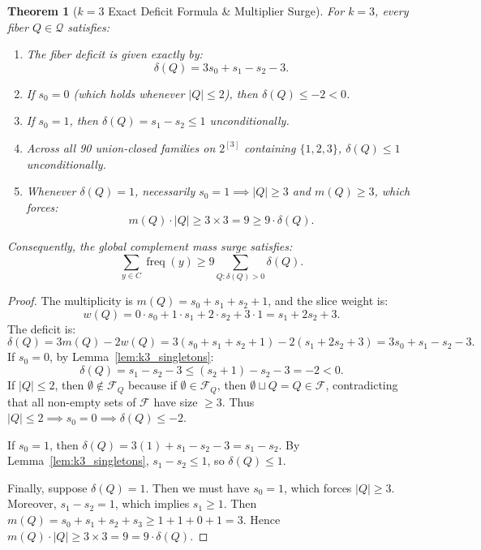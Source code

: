 \documentclass[11pt,a4paper]{article}
\theoremstyle{plain}
\newtheorem{theorem}{Theorem}[section]
\theoremstyle{definition}
\theoremstyle{remark}
\newcommand{\F}{\mathcal{F}}
\newcommand{\Q}{\mathcal{Q}}
\newcommand{\freq}{\operatorname{freq}}
\begin{document}
\begin{theorem}[$k=3$ Exact Deficit Formula \& Multiplier Surge]\label{thm:k3_multiplier}
For $k = 3$, every fiber $Q \in \Q$ satisfies:
\begin{enumerate}
    \item The fiber deficit is given exactly by:
    \begin{equation}
    \delta(Q) = 3 s_0 + s_1 - s_2 - 3.
    \end{equation}
    \item If $s_0 = 0$ (which holds whenever $|Q| \le 2$), then $\delta(Q) \le -2 < 0$.
    \item If $s_0 = 1$, then $\delta(Q) = s_1 - s_2 \le 1$ unconditionally.
    \item Across all 90 union-closed families on $2^{[3]}$ containing $\{1, 2, 3\}$, $\delta(Q) \le 1$ unconditionally.
    \item Whenever $\delta(Q) = 1$, necessarily $s_0 = 1 \implies |Q| \ge 3$ and $m(Q) \ge 3$, which forces:
    \begin{equation}
    m(Q) \cdot |Q| \ge 3 \times 3 = 9 \ge 9 \cdot \delta(Q).
    \end{equation}
\end{enumerate}
Consequently, the global complement mass surge satisfies:
\begin{equation}
\sum_{y \in C} \freq(y) \ge 9 \sum_{Q : \delta(Q) > 0} \delta(Q).
\end{equation}
\end{theorem}
\begin{proof}
The multiplicity is $m(Q) = s_0 + s_1 + s_2 + 1$, and the slice weight is:
\begin{equation}
w(Q) = 0 \cdot s_0 + 1 \cdot s_1 + 2 \cdot s_2 + 3 \cdot 1 = s_1 + 2 s_2 + 3.
\end{equation}
The deficit is:
\begin{equation}
\delta(Q) = 3 m(Q) - 2 w(Q) = 3(s_0 + s_1 + s_2 + 1) - 2(s_1 + 2 s_2 + 3) = 3 s_0 + s_1 - s_2 - 3.
\end{equation}
If $s_0 = 0$, by Lemma~\ref{lem:k3_singletons}:
\begin{equation}
\delta(Q) = s_1 - s_2 - 3 \le (s_2 + 1) - s_2 - 3 = -2 < 0.
\end{equation}
If $|Q| \le 2$, then $\emptyset \notin \F_Q$ because if $\emptyset \in \F_Q$, then $\emptyset \sqcup Q = Q \in \F$, contradicting that all non-empty sets of $\F$ have size $\ge 3$. Thus $|Q| \le 2 \implies s_0 = 0 \implies \delta(Q) \le -2$.

If $s_0 = 1$, then $\delta(Q) = 3(1) + s_1 - s_2 - 3 = s_1 - s_2$. By Lemma~\ref{lem:k3_singletons}, $s_1 - s_2 \le 1$, so $\delta(Q) \le 1$.

Finally, suppose $\delta(Q) = 1$. Then we must have $s_0 = 1$, which forces $|Q| \ge 3$. Moreover, $s_1 - s_2 = 1$, which implies $s_1 \ge 1$. Then $m(Q) = s_0 + s_1 + s_2 + s_3 \ge 1 + 1 + 0 + 1 = 3$. Hence $m(Q) \cdot |Q| \ge 3 \times 3 = 9 = 9 \cdot \delta(Q)$.
\end{proof}
\end{document}
